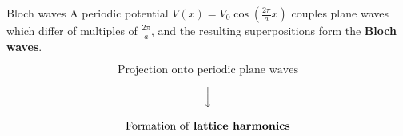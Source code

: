 \begin{frame}{Bloch waves}
    A periodic potential $V(x)=V_0\cos\left(\frac{2\pi}{a}x\right)$ couples plane waves which differ of multiples of $\frac{2\pi}{a}$, and the resulting superpositions form the \textcolor{BrickRed}{\textbf{Bloch waves}}.

    \vspace{-0.15cm}

    \begin{equation*}
        \text{Projection onto periodic plane waves}
    \end{equation*}

    \vspace{-0.3cm}

    \begin{equation*}
        \Big\downarrow
    \end{equation*}

    \vspace{-0.25cm}

    \begin{equation*}
        \text{Formation of \textbf{lattice harmonics}}
    \end{equation*}

    \vfill


\end{frame}
